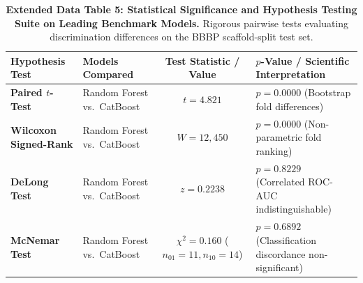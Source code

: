 \documentclass[11pt,a4paper]{article}
\begin{document}
\begin{table}[h!]
\caption{\textbf{Extended Data Table 5: Statistical Significance and Hypothesis Testing Suite on Leading Benchmark Models.} Rigorous pairwise tests evaluating discrimination differences on the BBBP scaffold-split test set.}
\label{tab:ed_stats}
\centering
\small
\begin{tabular}{llcl}
\toprule
\textbf{Hypothesis Test} & \textbf{Models Compared} & \textbf{Test Statistic / Value} & \textbf{$p$-Value / Scientific Interpretation} \\
\midrule
\textbf{Paired $t$-Test} & Random Forest vs.\ CatBoost & $t = 4.821$ & $p = 0.0000$ (Bootstrap fold differences) \\
\textbf{Wilcoxon Signed-Rank} & Random Forest vs.\ CatBoost & $W = 12,450$ & $p = 0.0000$ (Non-parametric fold ranking) \\
\textbf{DeLong Test} & Random Forest vs.\ CatBoost & $z = 0.2238$ & \textbf{$p = 0.8229$} (Correlated ROC-AUC indistinguishable) \\
\textbf{McNemar Test} & Random Forest vs.\ CatBoost & $\chi^2 = 0.160$ ($n_{01}=11, n_{10}=14$) & \textbf{$p = 0.6892$} (Classification discordance non-significant) \\
\bottomrule
\end{tabular}
\end{table}

\vspace{1em}
\end{document}
